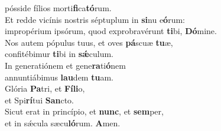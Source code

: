 \evenverse pósside fílios morti\textbf{fi}ca\textbf{tó}rum.\\
\oddverse Et redde vicínis nostris séptuplum in \textbf{si}nu e\textbf{ó}rum:~\*\\
\oddverse impropérium ipsórum, quod exprobravérunt \textbf{ti}bi, \textbf{Dó}mine.\\
\evenverse Nos autem pópulus tuus, et oves \textbf{pá}scuæ \textbf{tu}æ,~\*\\
\evenverse confitébimur \textbf{ti}bi in \textbf{sǽ}culum.\\
\oddverse In generatiónem et gene\textbf{ra}ti\textbf{ó}nem~\*\\
\oddverse annuntiábimus \textbf{lau}dem \textbf{tu}am.\\
\evenverse Glória \textbf{Pa}tri, et \textbf{Fí}\textbf{li}o,~\*\\
\evenverse et Spi\textbf{rí}tui \textbf{San}cto.\\
\oddverse Sicut erat in princípio, et \textbf{nunc}, et \textbf{sem}per,~\*\\
\oddverse et in sǽcula sæcu\textbf{ló}rum. \textbf{A}men.\\

